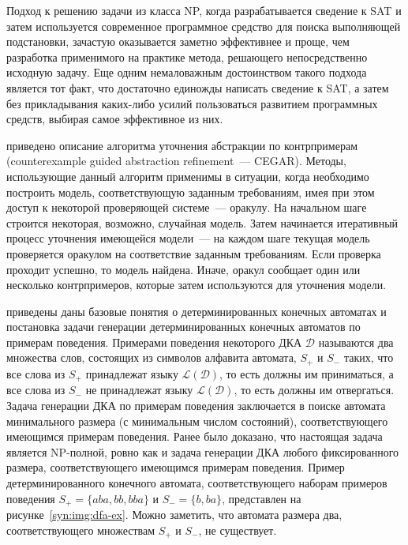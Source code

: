 Подход к решению задачи из класса NP, когда разрабатывается сведение к SAT и затем используется современное программное средство для поиска выполняющей подстановки, зачастую оказывается заметно эффективнее и проще, чем разработка применимого на практике метода, решающего непосредственно исходную задачу.
Еще одним немаловажным достоинством такого подхода является тот факт, что достаточно единожды написать сведение к SAT, а затем без прикладывания каких-либо усилий пользоваться развитием программных средств, выбирая самое эффективное из них.

\insection{\ref{sec:review:cegar}} приведено описание алгоритма уточнения абстракции по контрпримерам (counterexample guided abstraction refinement~{---} CEGAR). 
Методы, использующие данный алгоритм применимы в ситуации, когда необходимо построить модель, соответствующую заданным требованиям, имея при этом доступ к некоторой проверяющей системе~--- оракулу. 
На начальном шаге строится некоторая, возможно, случайная модель.
Затем начинается итеративный процесс уточнения имеющейся модели~--- на каждом шаге текущая модель проверяется оракулом на соответствие заданным требованиям. 
Если проверка проходит успешно, то модель найдена.
Иначе, оракул сообщает один или несколько контрпримеров, которые затем используются для уточнения модели.

\insection{\ref{sec:review:dfa-inf}} приведены даны базовые понятия о детерминированных конечных автоматах и постановка задачи генерации детерминированных конечных автоматов по примерам поведения. 
Примерами поведения некоторого ДКА $\mathcal{D}$ называются два множества слов, состоящих из символов алфавита автомата, $S_{+}$ и $S_{-}$ таких, что все слова из $S_{+}$ принадлежат языку $\mathcal{L}\left(\mathcal{D}\right)$, то есть должны им приниматься, а все слова из $S_{-}$ не принадлежат языку $\mathcal{L}\left(\mathcal{D}\right)$, то есть должны им отвергаться.
Задача генерации ДКА по примерам поведения заключается в поиске автомата минимального размера (с минимальным числом состояний), соответствующего имеющимся примерам поведения.
Ранее было доказано, что настоящая задача является NP-полной, ровно как и задача генерации ДКА любого фиксированного размера, соответствующего имеющимся примерам поведения.
Пример детерминированного конечного автомата, соответствующего наборам примеров поведения $S_{+} = \{aba, bb, bba\}$ и $S_{-} = \{b, ba\}$, представлен на рисунке~\ref{syn:img:dfa-ex}.
Можно заметить, что автомата размера два, соответствующего множествам $S_{+}$ и $S_{-}$, не существует.

